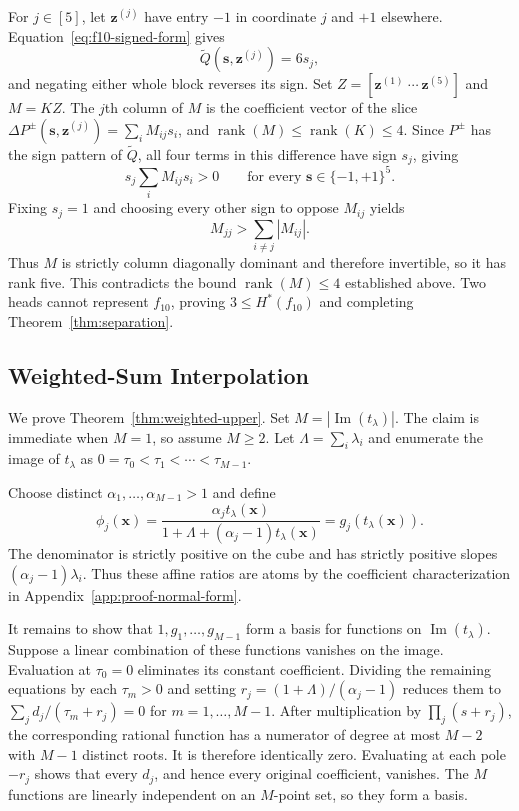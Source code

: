 \documentclass{article}
\theoremstyle{definition}
\theoremstyle{plain}
\newcommand{\hstar}{H^{\ast}}
\begin{document}
For $j\in[5]$, let $\mathbf{z}^{(j)}$ have entry $-1$ in coordinate $j$ and $+1$ elsewhere. Equation~\eqref{eq:f10-signed-form} gives
\begin{equation}
\widetilde Q(\mathbf{s},\mathbf{z}^{(j)})=6s_j,
\end{equation}
and negating either whole block reverses its sign. Set $Z=[\mathbf{z}^{(1)}\ \cdots\ \mathbf{z}^{(5)}]$ and $M=KZ$. The $j$th column of $M$ is the coefficient vector of the slice $\Delta P^{\pm}(\mathbf{s},\mathbf{z}^{(j)})=\sum_i M_{ij}s_i$, and $\operatorname{rank}(M)\leq\operatorname{rank}(K)\leq4$. Since $P^{\pm}$ has the sign pattern of $\widetilde Q$, all four terms in this difference have sign $s_j$, giving
\begin{equation}
s_j\sum_iM_{ij}s_i>0
\qquad\text{for every }\mathbf{s}\in\{-1,+1\}^5.
\end{equation}
Fixing $s_j=1$ and choosing every other sign to oppose $M_{ij}$ yields
\begin{equation}
M_{jj}>\sum_{i\neq j}|M_{ij}|.
\end{equation}
Thus $M$ is strictly column diagonally dominant and therefore invertible, so it has rank five. This contradicts the bound $\operatorname{rank}(M)\leq4$ established above. Two heads cannot represent $f_{10}$, proving $3\leq\hstar(f_{10})$ and completing Theorem~\ref{thm:separation}.

\subsection{Weighted-Sum Interpolation}
\label{app:proof-weighted}

We prove Theorem~\ref{thm:weighted-upper}. Set $M=|\operatorname{Im}(t_\lambda)|$. The claim is immediate when $M=1$, so assume $M\geq2$. Let $\Lambda=\sum_i\lambda_i$ and enumerate the image of $t_\lambda$ as $0=\tau_0<\tau_1<\cdots<\tau_{M-1}$.

Choose distinct $\alpha_1,\ldots,\alpha_{M-1}>1$ and define
\begin{equation}
\phi_j(\mathbf{x})=\frac{\alpha_j t_\lambda(\mathbf{x})}{1+\Lambda+(\alpha_j-1)t_\lambda(\mathbf{x})}
=g_j(t_\lambda(\mathbf{x})).
\label{eq:weighted-response}
\end{equation}
The denominator is strictly positive on the cube and has strictly positive slopes $(\alpha_j-1)\lambda_i$. Thus these affine ratios are atoms by the coefficient characterization in Appendix~\ref{app:proof-normal-form}.

It remains to show that $1,g_1,\ldots,g_{M-1}$ form a basis for functions on $\operatorname{Im}(t_\lambda)$. Suppose a linear combination of these functions vanishes on the image. Evaluation at $\tau_0=0$ eliminates its constant coefficient. Dividing the remaining equations by each $\tau_m>0$ and setting $r_j=(1+\Lambda)/(\alpha_j-1)$ reduces them to $\sum_jd_j/(\tau_m+r_j)=0$ for $m=1,\ldots,M-1$. After multiplication by $\prod_j(s+r_j)$, the corresponding rational function has a numerator of degree at most $M-2$ with $M-1$ distinct roots. It is therefore identically zero. Evaluating at each pole $-r_j$ shows that every $d_j$, and hence every original coefficient, vanishes. The $M$ functions are linearly independent on an $M$-point set, so they form a basis.
\end{document}
